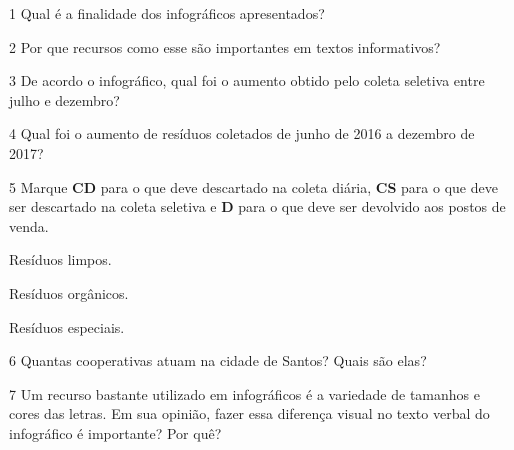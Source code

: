 \begin{myquote}
\end{myquote}

\vspace{1em}

\num{1} Qual é a finalidade dos infográficos apresentados?


\num{2} Por que recursos como esse são importantes em textos informativos?


\num{3} De acordo o infográfico, qual foi o aumento obtido
pelo coleta seletiva entre julho e dezembro?


\num{4} Qual foi o aumento de resíduos coletados de junho de 2016 a dezembro de 2017?


\num{5} Marque \textbf{CD} para o que deve descartado na coleta diária,
\textbf{CS} para o que deve ser descartado na coleta seletiva e \textbf{D}
para o que deve ser devolvido aos postos de venda.

\begin{boxlist}
 Resíduos limpos.

 Resíduos orgânicos.

 Resíduos especiais.
\end{boxlist}

\num{6} Quantas cooperativas atuam na cidade de Santos? Quais são elas?


\num{7} Um recurso bastante utilizado em infográficos é a variedade de
tamanhos e cores das letras. Em sua opinião, fazer essa diferença visual
no texto verbal do infográfico é importante? Por quê?

